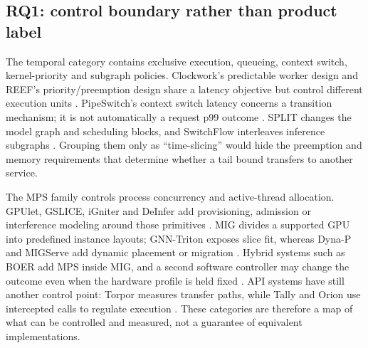 \subsection{RQ1: control boundary rather than product label}
The temporal category contains exclusive execution, queueing, context switch, kernel-priority and subgraph policies. Clockwork's predictable worker design and REEF's priority/preemption design share a latency objective but control different execution units \cite{clockwork,reef}. PipeSwitch's context switch latency concerns a transition mechanism; it is not automatically a request p99 outcome \cite{pipeswitch}. SPLIT changes the model graph and scheduling blocks, and SwitchFlow interleaves inference subgraphs \cite{split,switchflow}. Grouping them only as ``time-slicing'' would hide the preemption and memory requirements that determine whether a tail bound transfers to another service.

The MPS family controls process concurrency and active-thread allocation. GPUlet, GSLICE, iGniter and DeInfer add provisioning, admission or interference modeling around those primitives \cite{gpulet,gslice,igniter,deinfer}. MIG divides a supported GPU into predefined instance layouts; GNN-Triton exposes slice fit, whereas Dyna-P and MIGServe add dynamic placement or migration \cite{gnntriton,dynap,migserve}. Hybrid systems such as BOER add MPS inside MIG, and a second software controller may change the outcome even when the hardware profile is held fixed \cite{boer}. API systems have still another control point: Torpor measures transfer paths, while Tally and Orion use intercepted calls to regulate execution \cite{torpor,tally,orion}. These categories are therefore a map of what can be controlled and measured, not a guarantee of equivalent implementations.


